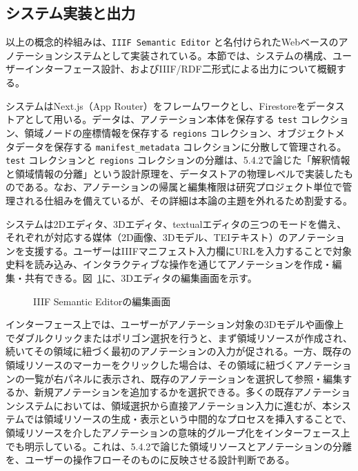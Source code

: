 \subsection{システム実装と出力}

以上の概念的枠組みは、\texttt{IIIF Semantic Editor} と名付けられたWebベースのアノテーションシステムとして実装されている。本節では、システムの構成、ユーザーインターフェース設計、およびIIIF/RDF二形式による出力について概観する。

システムはNext.js（App Router）をフレームワークとし、Firestoreをデータストアとして用いる。データは、アノテーション本体を保存する \texttt{test} コレクション、領域ノードの座標情報を保存する \texttt{regions} コレクション、オブジェクトメタデータを保存する \texttt{manifest\_metadata} コレクションに分散して管理される。\texttt{test} コレクションと \texttt{regions} コレクションの分離は、5.4.2で論じた「解釈情報と領域情報の分離」という設計原理を、データストアの物理レベルで実装したものである。なお、アノテーションの帰属と編集権限は研究プロジェクト単位で管理される仕組みを備えているが、その詳細は本論の主題を外れるため割愛する。

システムは2Dエディタ、3Dエディタ、textualエディタの三つのモードを備え、それぞれが対応する媒体（2D画像、3Dモデル、TEIテキスト）のアノテーションを支援する。ユーザーはIIIFマニフェスト入力欄にURLを入力することで対象史料を読み込み、インタラクティブな操作を通じてアノテーションを作成・編集・共有できる。図~\ref{fig:ch5-editor}に、3Dエディタの編集画面を示す。

\begin{figure}[htbp]
  \centering
  \caption{IIIF Semantic Editorの編集画面}
  \label{fig:ch5-editor}
\end{figure}

インターフェース上では、ユーザーがアノテーション対象の3Dモデルや画像上でダブルクリックまたはポリゴン選択を行うと、まず領域リソースが作成され、続いてその領域に紐づく最初のアノテーションの入力が促される。一方、既存の領域リソースのマーカーをクリックした場合は、その領域に紐づくアノテーションの一覧が右パネルに表示され、既存のアノテーションを選択して参照・編集するか、新規アノテーションを追加するかを選択できる。多くの既存アノテーションシステムにおいては、領域選択から直接アノテーション入力に進むが、本システムでは領域リソースの生成・表示という中間的なプロセスを挿入することで、領域リソースを介したアノテーションの意味的グループ化をインターフェース上でも明示している。これは、5.4.2で論じた領域リソースとアノテーションの分離を、ユーザーの操作フローそのものに反映させる設計判断である。


